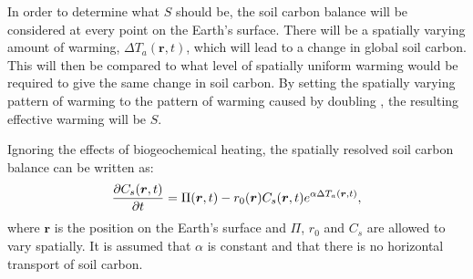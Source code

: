 In order to determine what $S$ should be, the soil carbon balance will be considered at every point on the Earth's surface. There will be a spatially varying amount of warming,
$\Delta T_a(\bm{r},t)$, which will lead to a change in global soil carbon.
This will then be compared to what level of spatially uniform warming would be required to give the same change in soil carbon. By setting the spatially varying
pattern of warming to the pattern of warming caused by doubling , the resulting effective warming will be $S$.

Ignoring the effects of biogeochemical heating, the spatially resolved soil carbon balance can be written as:
\begin{equation}
  \label{eq:spatially_resolved_soil_carbon}
  \pdv{C_s(\bm{r},t)}{t} = \Pi(\bm{r},t) - r_0(\bm{r})C_s(\bm{r},t)e^{\alpha \Delta T_a(\bm{r},t)},
\end{equation}
where $\bm{r}$ is the position on the Earth's surface and $\Pi$, $r_0$ and $C_s$ are allowed to vary spatially. It is assumed that $\alpha$ is constant and that there is no
horizontal transport of soil carbon.

